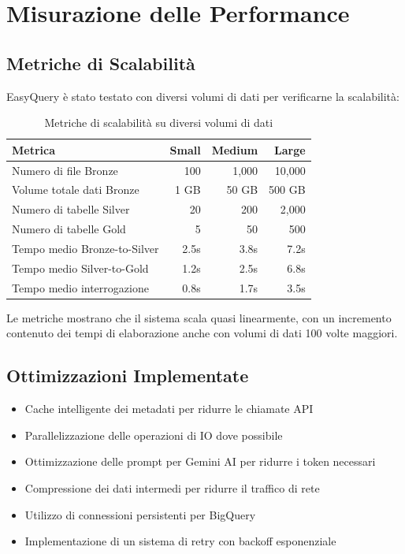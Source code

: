 \documentclass[11pt,a4paper,twoside]{report}
\begin{document}
\chapter{Misurazione delle Performance}

\section{Metriche di Scalabilità}
EasyQuery è stato testato con diversi volumi di dati per verificarne la scalabilità:

\begin{table}[H]
\centering
\begin{tabular}{lrrr}
\toprule
\textbf{Metrica} & \textbf{Small} & \textbf{Medium} & \textbf{Large}\\
\midrule
Numero di file Bronze & 100 & 1,000 & 10,000\\
Volume totale dati Bronze & 1 GB & 50 GB & 500 GB\\
Numero di tabelle Silver & 20 & 200 & 2,000\\
Numero di tabelle Gold & 5 & 50 & 500\\
Tempo medio Bronze-to-Silver & 2.5s & 3.8s & 7.2s\\
Tempo medio Silver-to-Gold & 1.2s & 2.5s & 6.8s\\
Tempo medio interrogazione & 0.8s & 1.7s & 3.5s\\
\bottomrule
\end{tabular}
\caption{Metriche di scalabilità su diversi volumi di dati}
\label{tab:scalability_metrics}
\end{table}

Le metriche mostrano che il sistema scala quasi linearmente, con un incremento contenuto dei tempi di elaborazione anche con volumi di dati 100 volte maggiori.

\section{Ottimizzazioni Implementate}
\begin{itemize}
    \item Cache intelligente dei metadati per ridurre le chiamate API
    \item Parallelizzazione delle operazioni di IO dove possibile
    \item Ottimizzazione delle prompt per Gemini AI per ridurre i token necessari
    \item Compressione dei dati intermedi per ridurre il traffico di rete
    \item Utilizzo di connessioni persistenti per BigQuery
    \item Implementazione di un sistema di retry con backoff esponenziale
\end{itemize}
\end{document}
